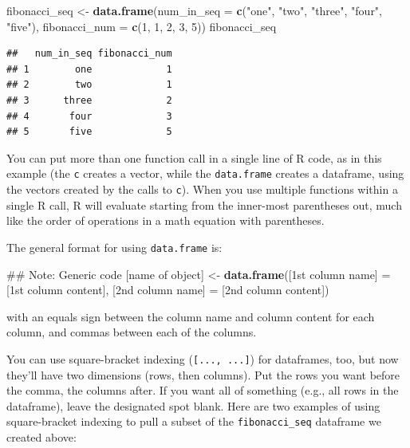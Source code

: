 \documentclass[]{book}
\makeatletter
\newenvironment{Shaded}{\begin{snugshade}}{\end{snugshade}}
\newcommand{\KeywordTok}[1]{\textcolor[rgb]{0.13,0.29,0.53}{\textbf{#1}}}
\newcommand{\DataTypeTok}[1]{\textcolor[rgb]{0.13,0.29,0.53}{#1}}
\newcommand{\DecValTok}[1]{\textcolor[rgb]{0.00,0.00,0.81}{#1}}
\newcommand{\StringTok}[1]{\textcolor[rgb]{0.31,0.60,0.02}{#1}}
\newcommand{\NormalTok}[1]{#1}
\newenvironment{kframe}{%
\medskip{}
\setlength{\fboxsep}{.8em}
 \def\at@end@of@kframe{}%
 \ifinner\ifhmode%
  \def\at@end@of@kframe{\end{minipage}}%
  \begin{minipage}{\columnwidth}%
 \fi\fi%
 \def\FrameCommand##1{\hskip\@totalleftmargin \hskip-\fboxsep
 \colorbox{shadecolor}{##1}\hskip-\fboxsep
     \hskip-\linewidth \hskip-\@totalleftmargin \hskip\columnwidth}%
 \MakeFramed {\advance\hsize-\width
   \@totalleftmargin\z@ \linewidth\hsize
   \@setminipage}}%
 {\par\unskip\endMakeFramed%
 \at@end@of@kframe}
\renewenvironment{Shaded}{\begin{kframe}}{\end{kframe}}
\newenvironment{rmdblock}[1]
  {
  \begin{itemize}
  \renewcommand{\labelitemi}{
    \raisebox{-.7\height}[0pt][0pt]{
      {\setkeys{Gin}{width=3em,keepaspectratio}\texttt{[image: images/\#1]}}
    }
  }
  \setlength{\fboxsep}{1em}
  \begin{kframe}
  \item
  }
  {
  \end{kframe}
  \end{itemize}
  }
\newenvironment{rmdnote}
  {\begin{rmdblock}{note}}
  {\end{rmdblock}}
\theoremstyle{definition}
\theoremstyle{definition}
\theoremstyle{definition}
\theoremstyle{remark}
\makeatother
\begin{document}
\begin{Shaded}
\begin{Highlighting}[]
\NormalTok{fibonacci_seq <-}\StringTok{ }\KeywordTok{data.frame}\NormalTok{(}\DataTypeTok{num_in_seq =} \KeywordTok{c}\NormalTok{(}\StringTok{"one"}\NormalTok{, }\StringTok{"two"}\NormalTok{, }\StringTok{"three"}\NormalTok{,}
                                           \StringTok{"four"}\NormalTok{, }\StringTok{"five"}\NormalTok{),}
                            \DataTypeTok{fibonacci_num =} \KeywordTok{c}\NormalTok{(}\DecValTok{1}\NormalTok{, }\DecValTok{1}\NormalTok{, }\DecValTok{2}\NormalTok{, }\DecValTok{3}\NormalTok{, }\DecValTok{5}\NormalTok{))}
\NormalTok{fibonacci_seq}
\end{Highlighting}
\end{Shaded}

\begin{verbatim}
##   num_in_seq fibonacci_num
## 1        one             1
## 2        two             1
## 3      three             2
## 4       four             3
## 5       five             5
\end{verbatim}

\begin{rmdnote}
You can put more than one function call in a single line of R code, as
in this example (the \texttt{c} creates a vector, while the
\texttt{data.frame} creates a dataframe, using the vectors created by
the calls to \texttt{c}). When you use multiple functions within a
single R call, R will evaluate starting from the inner-most parentheses
out, much like the order of operations in a math equation with
parentheses.
\end{rmdnote}

The general format for using \texttt{data.frame} is:

\begin{Shaded}
\begin{Highlighting}[]
\NormalTok{## Note: Generic code}
\NormalTok{[name of object] <-}\StringTok{ }\KeywordTok{data.frame}\NormalTok{([1st column name] =}\StringTok{ }\NormalTok{[1st column content],}
\NormalTok{                               [2nd column name] =}\StringTok{ }\NormalTok{[2nd column content])}
\end{Highlighting}
\end{Shaded}

with an equals sign between the column name and column content for each
column, and commas between each of the columns.

You can use square-bracket indexing (\texttt{{[}...,\ ...{]}}) for
dataframes, too, but now they'll have two dimensions (rows, then
columns). Put the rows you want before the comma, the columns after. If
you want all of something (e.g., all rows in the dataframe), leave the
designated spot blank. Here are two examples of using square-bracket
indexing to pull a subset of the \texttt{fibonacci\_seq} dataframe we
created above:
\end{document}
